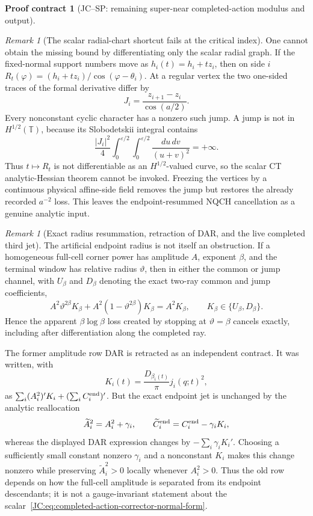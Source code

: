 \documentclass[11pt]{amsart}
\numberwithin{equation}{section}
\theoremstyle{definition}
\newtheorem{contract}[theorem]{Proof contract}
\theoremstyle{remark}
\newtheorem{remark}[theorem]{Remark}
\begin{document}
\begin{contract}[JC--SP: remaining super-near completed-action modulus and output]
\begin{remark}[The scalar radial-chart shortcut fails at the critical index]
\label{JC:rem:super-near-radial-Hhalf-obstruction}
One cannot obtain the missing bound by differentiating only the scalar
radial graph.  If the fixed-normal support numbers move as
$h_i(t)=h_i+tz_i$, then on side $i$
$R_t(\varphi)=(h_i+tz_i)/\cos(\varphi-\theta_i)$.  At a regular vertex
the two one-sided traces of the formal derivative differ by
\begin{equation}\label{JC:eq:super-near-radial-Hhalf-jump}
 J_i=\frac{z_{i+1}-z_i}{\cos(a/2)}.
\end{equation}
Every nonconstant cyclic character has a nonzero such jump.  A jump is
not in $H^{1/2}(\mathbb T)$, because its Slobodetskii integral contains
\[
 \frac{|J_i|^2}{4}
 \int_0^{\varepsilon/2}\!\int_0^{\varepsilon/2}
 \frac{du\,dv}{(u+v)^2}=+\infty.
\]
Thus $t\mapsto R_t$ is not differentiable as an $H^{1/2}$-valued curve,
so the scalar CT analytic-Hessian theorem cannot be invoked.  Freezing
the vertices by a continuous physical affine-side field removes the jump
but restores the already recorded $a^{-2}$ loss.  This leaves the
endpoint-resummed NQCH cancellation as a genuine analytic input.
\end{remark}

\begin{remark}[Exact radius resummation, retraction of DAR, and the live completed third jet]
\label{JC:rem:super-near-completed-third-jet}
The artificial endpoint radius is not itself an obstruction.  If a
homogeneous full-cell corner power has amplitude $A$, exponent $\beta$, and
the terminal window has relative radius $\vartheta$, then in either the
common or jump channel, with $U_\beta$ and $D_\beta$ denoting the exact
two-ray common and jump coefficients,
\[
 A^2\vartheta^{2\beta}K_\beta
 +A^2(1-\vartheta^{2\beta})K_\beta=A^2K_\beta,
 \qquad K_\beta\in\{U_\beta,D_\beta\}.
\]
Hence the apparent $\beta\log\beta$ loss created by stopping at
$\vartheta=\beta$ cancels exactly, including after differentiation along
the completed ray.

The former amplitude row DAR is retracted as an independent contract.  It
was written, with
\[
 K_i(t)=\frac{D_{\beta_i(t)}}\pi j_i(q;t)^2,
\]
as $\sum_i(A_i^2)'K_i+(\sum_iC_i^{\rm end})'$.  But the exact endpoint
jet is unchanged by the analytic reallocation
\[
 \widetilde A_i^2=A_i^2+\gamma_i,
 \qquad
 \widetilde C_i^{\rm end}=C_i^{\rm end}-\gamma_iK_i,
\]
whereas the displayed DAR expression changes by
$-\sum_i\gamma_iK_i'$.  Choosing a sufficiently small constant nonzero
$\gamma_i$ and a nonconstant $K_i$ makes this change nonzero while
preserving $\widetilde A_i^2>0$ locally whenever $A_i^2>0$.  Thus the old
row depends on how the full-cell amplitude is
separated from its endpoint descendants; it is not a gauge-invariant
statement about the scalar~\eqref{JC:eq:completed-action-corrector-normal-form}.


\end{remark}
\end{contract}
\end{document}
